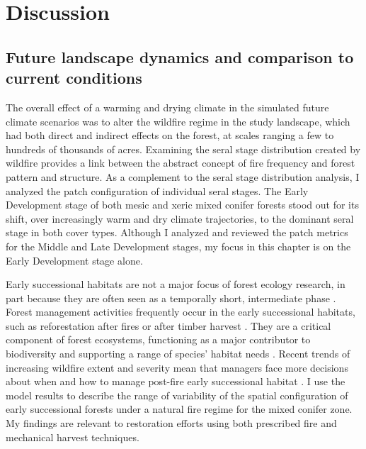 \section{Discussion}

\subsection{Future landscape dynamics and comparison to current conditions}

The overall effect of a warming and drying climate in the simulated future climate scenarios was to alter the wildfire regime in the study landscape, which had both direct and indirect effects on the forest, at scales ranging a few to hundreds of thousands of acres. Examining the seral stage distribution created by wildfire provides a link between the abstract concept of fire frequency and forest pattern and structure. As a complement to the seral stage distribution analysis, I analyzed the patch configuration of individual seral stages. The Early Development stage of both mesic and xeric mixed conifer forests stood out for its shift, over increasingly warm and dry climate trajectories, to the dominant seral stage in both cover types. Although I analyzed and reviewed the patch metrics for the Middle and Late Development stages, my focus in this chapter is on the Early Development stage alone.

Early successional habitats are not a major focus of forest ecology research, in part because they are often seen as a temporally short, intermediate phase \citep{Swanson2011}. Forest management activities frequently occur in the early successional habitats, such as reforestation after fires or after timber harvest \citep{Stephens2010}. They are a critical component of forest ecosystems, functioning as a major contributor to biodiversity and supporting a range of species' habitat needs \citep{Chang1995,Hutto2008,Swanson2011}. Recent trends of increasing wildfire extent and severity mean that managers face more decisions about when and how to manage post-fire early successional habitat \citep{Stephens2013,Dellasala2014}. I use the model results to describe the range of variability of the spatial configuration of early successional forests under a natural fire regime for the mixed conifer zone. My findings are relevant to restoration efforts using both prescribed fire and mechanical harvest techniques. 

